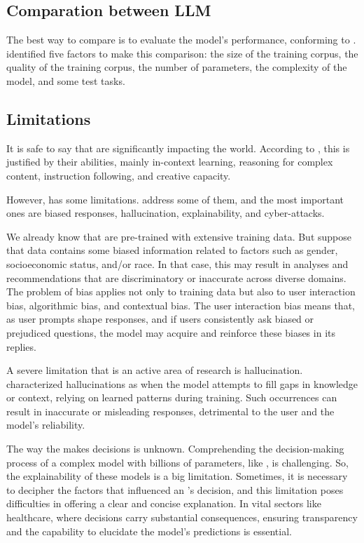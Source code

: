 

\subsection{Comparation between LLM}

The best way to compare {\llm} is to evaluate the model's performance, conforming to \citet{hadi_LLM_2023}. \citet{hadi_LLM_2023} identified five factors to make this comparison: the size of the training corpus, the quality of the training corpus, the number of parameters, the complexity of the model, and some test tasks.




\subsection{Limitations}

It is safe to say that {\llm} are significantly impacting the world. According to \citet{liu_prompting_nodate}, this is justified by their abilities, mainly in-context learning, reasoning for complex content, instruction following, and creative capacity.

However, {\llm} has some limitations. \citet{hadi_LLM_2023} address some of them, and the most important ones are biased responses, hallucination, explainability, and cyber-attacks. 

We already know that {\llm} are pre-trained with extensive training data. But suppose that data contains some biased information related to factors such as gender, socioeconomic status, and/or race. In that case, this may result in analyses and recommendations that are discriminatory or inaccurate across diverse domains. The problem of bias applies not only to training data but also to user interaction bias, algorithmic bias, and contextual bias. The user interaction bias means that, as user prompts shape responses, and if users consistently ask biased or prejudiced questions, the model may acquire and reinforce these biases in its replies.

A severe limitation that is an active area of research is hallucination. \citet{hadi_LLM_2023} characterized {\llm} hallucinations as when the model attempts to fill gaps in knowledge or context, relying on learned patterns during training. Such occurrences can result in inaccurate or misleading responses, detrimental to the user and the model's reliability.

The way the {\llm} makes decisions is unknown. Comprehending the decision-making process of a complex model with billions of parameters, like {\llm}, is challenging. So, the explainability of these models is a big limitation. Sometimes, it is necessary to decipher the factors that influenced an {\llm}'s decision, and this limitation poses difficulties in offering a clear and concise explanation. In vital sectors like healthcare, where decisions carry substantial consequences, ensuring transparency and the capability to elucidate the model's predictions is essential.

